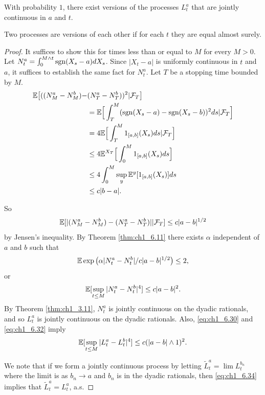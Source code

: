 \begin{proposition}\label{prop:6.16}
With probability $1$, there exist versions of the processes $L_t^a$ that are jointly continuous in $a$ and $t$.
\end{proposition}

Two processes are versions of each other if for each $t$ they are equal
almost surely.

\begin{proof}
It suffices to show this for times less than or equal to $M$ for every $M > 0$. Let $N_t^a = \int_0^{M\wedge t} \operatorname{sgn}(X_s - a)dX_s$. Since $|X_t - a|$ is uniformly continuous in $t$ and $a$, it suffices to establish the same fact for $N_t^a$. Let $T$ be a stopping time bounded by $M$.
\begin{align*}
    \mathbb{E}\big[((N_M^a - N_M^b) - &(N_T^a - N_T^b))^2| \mathcal{F}_T\big] \\
    &= \mathbb{E}\Big[\int_T^M (\operatorname{sgn}(X_s - a) - \operatorname{sgn}(X_s - b))^2ds| \mathcal{F}_T\Big] \\
    &= 4\mathbb{E}\Big[\int_T^M 1_{[a,b]}(X_s)ds| \mathcal{F}_T\Big] \\
    &\leq 4\mathbb{E}^{X_T}\Big[\int_0^M 1_{[a,b]}(X_s)ds\Big] \\
    &\leq 4\int_0^M \sup_y \mathbb{E}^y[1_{[a,b]}(X_s)]ds \\
    &\leq c|b - a|.
\end{align*}

So
\[
    \mathbb{E}[|(N_M^a - N_M^b) - (N_T^a - N_T^b)||\mathcal{F}_T] \leq c|a - b|^{1/2}
\]
by Jensen's inequality. By Theorem \ref{thm:ch1_6.11} there exists $\alpha$ independent of $a$ and $b$ such that
\[
    \mathbb{E} \exp\big(\alpha |N_t^a - N_t^b|/c|a - b|^{1/2}\big) \leq 2,
\]
or
\begin{equation}\label{eq:ch1_6.33}
    \mathbb{E}[\sup_{t\leq M} |N_t^a - N_t^b|^4] \leq c|a - b|^2.
\end{equation}
By Theorem \ref{thm:ch1_3.11}, $N_t^a$ is jointly continuous on the dyadic rationals, and so $L_t^a$ is jointly continuous on the dyadic rationals. Also, \eqref{eq:ch1_6.30} and \eqref{eq:ch1_6.32} imply
\mpagebreak
\begin{equation}\label{eq:ch1_6.34}
    \mathbb{E}[\sup_{t\leq M} |L_t^a - L_t^b|^4] \leq c(|a - b| \wedge 1)^2.
\end{equation}

We note that if we form a jointly continuous process by letting $\widetilde{L}_t^a = \lim L_t^{b_n}$ where the limit is as $b_n \to a$ and $b_n$ is in the dyadic rationals, then \eqref{eq:ch1_6.34} implies that $\widetilde{L}_t^a = L_t^a$, a.s.
\end{proof}

